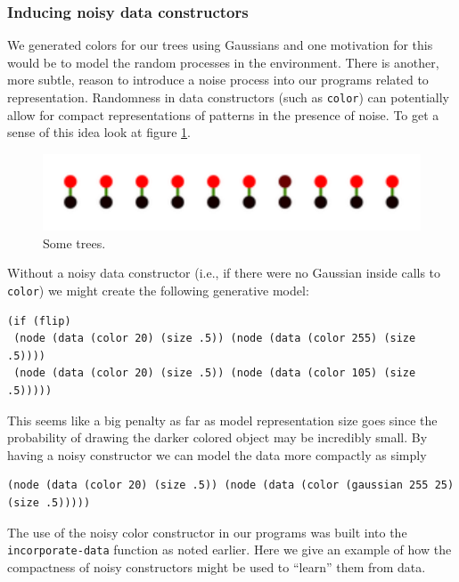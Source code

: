 \documentclass[a4paper,10pt]{article}
\begin{document}
\subsubsection{Inducing noisy data constructors}
We generated colors for our trees using Gaussians and one motivation for this would be to model the random processes in the environment.  There is another, more subtle, reason to introduce a noise process into our programs related to representation.  Randomness in data constructors (such as \texttt{color}) can potentially allow for compact representations of patterns in the presence of noise.  To get a sense of this idea look at figure \ref{fig:noiseCons}. 
\begin{figure}[h]
\begin{center}
\includegraphics[scale=.60]{../figures/noisyConstructor.pdf}
\end{center}
\caption{Some trees.}
\label{fig:noiseCons}
\end{figure}
Without a noisy data constructor (i.e., if there were no Gaussian inside calls to \texttt{color}) we might create the following generative model:
\begin{lstlisting}
(if (flip)
 (node (data (color 20) (size .5)) (node (data (color 255) (size .5))))
 (node (data (color 20) (size .5)) (node (data (color 105) (size .5)))))
\end{lstlisting}
This seems like a big penalty as far as model representation size goes since the probability of drawing the darker colored object may be incredibly small.  By having a noisy constructor we can model the data more compactly as simply 
\begin{lstlisting}
(node (data (color 20) (size .5)) (node (data (color (gaussian 255 25) (size .5)))))
\end{lstlisting}

The use of the noisy color constructor in our programs was built into the \texttt{incorporate-data} function as noted earlier.  Here we give an example of how the compactness of noisy constructors might be used to ``learn'' them from data.
\end{document}
